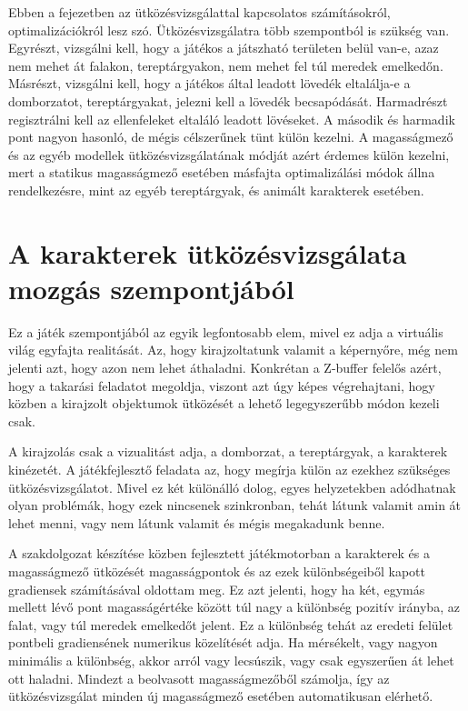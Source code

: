 \label{Chap:utkozesvizsgalat}

Ebben a fejezetben az ütközésvizsgálattal kapcsolatos számításokról, optimalizációkról lesz szó. Ütközésvizsgálatra több szempontból is szükség van. Egyrészt, vizsgálni kell, hogy a játékos a játszható területen belül van-e, azaz nem mehet át falakon, tereptárgyakon, nem mehet fel túl meredek emelkedőn. Másrészt, vizsgálni kell, hogy a játékos által leadott lövedék eltalálja-e a domborzatot, tereptárgyakat, jelezni kell a lövedék becsapódását. Harmadrészt regisztrálni kell az ellenfeleket eltaláló leadott lövéseket. A második és harmadik pont nagyon hasonló, de mégis célszerűnek tünt külön kezelni. A magasságmező és az egyéb modellek ütközésvizsgálatának módját azért érdemes külön kezelni, mert a statikus magasságmező esetében másfajta optimalizálási módok állna rendelkezésre, mint az egyéb tereptárgyak, és animált karakterek esetében.

\section{A karakterek ütközésvizsgálata mozgás szempontjából}

Ez a játék szempontjából az egyik legfontosabb elem, mivel ez adja a virtuális világ egyfajta realitását. Az, hogy kirajzoltatunk valamit a képernyőre, még nem jelenti azt, hogy azon nem lehet áthaladni. Konkrétan a Z-buffer felelős azért, hogy a takarási feladatot megoldja, viszont azt úgy képes végrehajtani, hogy közben a kirajzolt objektumok ütközését a lehető legegyszerűbb módon kezeli csak.

A kirajzolás csak a vizualitást adja, a domborzat, a tereptárgyak, a karakterek kinézetét. A játékfejlesztő feladata az, hogy megírja külön az ezekhez szükséges ütközésvizsgálatot. Mivel ez két különálló dolog, egyes helyzetekben adódhatnak olyan problémák, hogy ezek nincsenek szinkronban, tehát látunk valamit amin át lehet menni, vagy nem látunk valamit és mégis megakadunk benne.

A szakdolgozat készítése közben fejlesztett játékmotorban a karakterek és a magasságmező ütközését magasságpontok és az ezek különbségeiből kapott gradiensek számításával oldottam meg. Ez azt jelenti, hogy ha két, egymás mellett lévő pont magasságértéke között túl nagy a különbség pozitív irányba, az falat, vagy túl meredek emelkedőt jelent. Ez a különbség tehát az eredeti felület pontbeli gradiensének numerikus közelítését adja. Ha mérsékelt, vagy nagyon minimális a különbség, akkor arról vagy lecsúszik, vagy csak egyszerűen át lehet ott haladni. Mindezt a beolvasott magasságmezőből számolja, így az ütközésvizsgálat minden új magasságmező esetében automatikusan elérhető.

